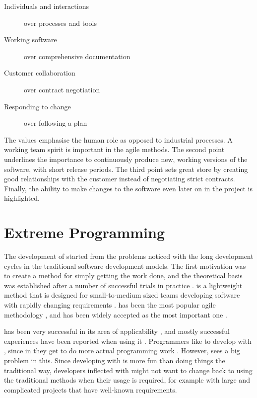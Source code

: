 \begin{description}
  \item[Individuals and interactions] over processes and tools
  \item[Working software] over comprehensive documentation
  \item[Customer collaboration] over contract negotiation
  \item[Responding to change] over following a plan
\end{description}

The values emphasise the human role as opposed to industrial 
processes. A working team spirit is important in the agile methods. 
The second point underlines the importance to continuously produce 
new, working versions of the software, with short release periods. The 
third point sets great store by creating good relationships with the 
customer instead of negotiating strict contracts. Finally, the ability 
to make changes to the software even later on in the project is 
highlighted. \citep{agilesdm}


\section{Extreme Programming}
\label{toc:agile:xp}

The development of  started from the problems noticed with 
the long development cycles in the traditional software development 
models. The first motivation was to create a method for simply getting 
the work done, and the theoretical basis was established after a 
number of successful trials in practice \citep{agilesdm}.  
is a lightweight method that is designed for small-to-medium sized 
teams developing software with rapidly changing requirements 
\citep{xpexplained}.  has been the most popular agile 
methodology \citep{rapidxp}, and has been widely accepted as the most 
important one \citep{agilescrum}.

 has been very successful in its area of applicability 
\citep{agilesd}, and mostly successful experiences have been reported 
when using it \citep{agilesdm}. Programmers like to develop with 
, since in  they get to do more actual 
programming work \citep{xpexplained}. However, \cite{questioningxp} 
sees a big problem in this. Since developing with  is more 
fun than doing things the traditional way, developers inflected with 
 might not want to change back to using the traditional 
methods when their usage is required, for example with large and 
complicated projects that have well-known requirements.


